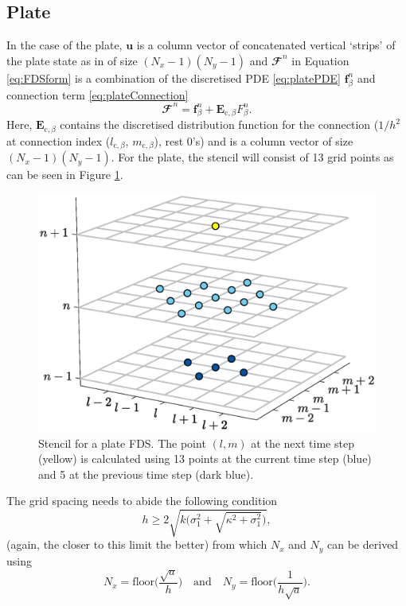 \documentclass{article}
\begin{document}
\subsection{Plate}
In the case of the plate, $\mathbf{u}$ is a column vector of concatenated vertical `strips' of the plate state as in \cite{Bilbao2009:ModularPercussion} of size $(N_x-1)(N_y-1)$ and $\mathbfcal{F}^n$ in Equation \eqref{eq:FDSform} is a combination of the discretised PDE \eqref{eq:platePDE} $\mathbf{f}_\beta^n$ and connection term \eqref{eq:plateConnection}
\begin{equation}\label{eq:FDSplate}
    \mathbfcal{F}^n = \mathbf{f}_\beta^n + \mathbf{E}_{\text{c},\beta}F_\beta^n.
\end{equation}
Here, $\mathbf{E}_{\text{c},\beta}$ contains the discretised distribution function for the connection ($1/h^2$ at connection index ($l_{\text{c},\beta}$, $m_{\text{c},\beta}$), rest 0's) and is a column vector of size $(N_x-1)(N_y-1)$.
For the plate, the stencil will consist of 13 grid points as can be seen in Figure \ref{fig:stencil2D}.
\begin{figure}[h]
\centering
\includegraphics[width=1.0\columnwidth]{stencil2Dedit.eps}
\caption{Stencil for a plate FDS. The point $(l,m)$ at the next time step (yellow) is calculated using 13 points at the current time step (blue) and 5 at the previous time step (dark blue). \label{fig:stencil2D}}
\end{figure}

\noindent The grid spacing needs to abide the following condition \cite{Bilbao2009:ModularPercussion}
\begin{equation}\label{eq:stabilityPlate}
h \geq 2\sqrt{k\bigg(\sigma_1^2 + \sqrt{\kappa^2+ \sigma_1^2}\bigg)},
\end{equation}
(again, the closer to this limit the better) from which $N_x$ and $N_y$ can be derived using
\begin{equation}
    N_x = \text{floor}\Bigg(\frac{\sqrt{a}}{h}\Bigg) \quad \text{and} \quad
    N_y = \text{floor}\Bigg(\frac{1}{h\sqrt{a}}\Bigg).
\end{equation}
\end{document}
